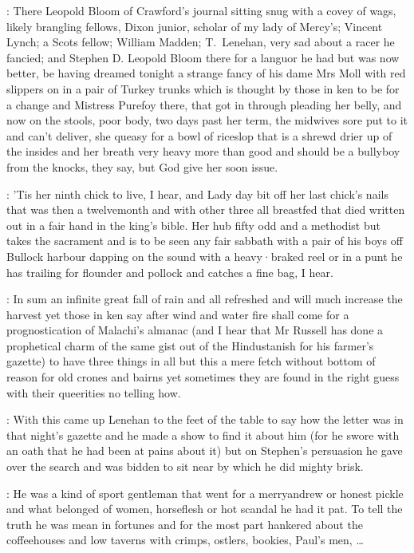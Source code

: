 :
There Leopold Bloom of Crawford's journal sitting snug with a covey
of wags,
likely brangling fellows,
Dixon junior,
scholar of my lady of
Mercy's;
Vincent Lynch;
a Scots fellow;
William Madden;
T.~Lenehan,
very
sad about a racer he fancied;
and Stephen D.
Leopold Bloom there for a
languor he had but was now better,
be having dreamed tonight a strange
fancy of his dame Mrs Moll with red slippers on in a pair of Turkey trunks
which is thought by those in ken to be for a change
and Mistress Purefoy there,
that got in through pleading her belly,
and now on the stools,
poor
body,
two days past her term,
the midwives sore put to it and can't
deliver,
she queasy for a bowl of riceslop that is a shrewd drier up of
the insides and her breath very heavy more than good and should be a
bullyboy from the knocks,
they say,
but God give her soon issue.

:
'Tis her ninth chick to live,
I hear,
and Lady day bit off her last
chick's nails that was then a twelvemonth and with other three all
breastfed that died written out in a fair hand in the king's bible.
Her
hub fifty odd and a methodist but takes the sacrament and is to be seen
any fair sabbath with a pair of his boys off Bullock harbour dapping on
the sound with a heavy·braked reel
or in a punt he has trailing for flounder and pollock and catches a fine bag,
I hear.

:
In sum an infinite great fall of rain and all refreshed and will much
increase the harvest yet those in ken say after wind and water fire shall
come for a prognostication of Malachi's almanac
(and I hear that Mr Russell has done a prophetical charm of the same gist out of the Hindustanish for his farmer's gazette) to have three things in all but
this a mere fetch without bottom of reason for old crones and bairns yet
sometimes they are found in the right guess with their queerities no
telling how.



:
With this came up Lenehan to the feet of the table
to say how the letter was in that night's gazette and he made a show to find it about him
(for he swore with an oath that he had been at pains about it)
but on Stephen's persuasion he gave over the search and was bidden to sit near
by which he did mighty brisk.

:
He was a kind of sport gentleman that went for a merryandrew or
honest pickle and what belonged of women,
horseflesh or hot scandal he had
it pat.
To tell the truth he was mean in fortunes and for the most part
hankered about the coffeehouses and low taverns with crimps,
ostlers,
bookies,
Paul's men,
\dots

